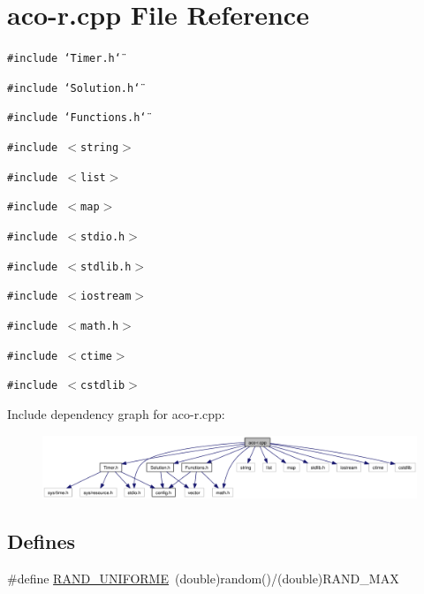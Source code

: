 \hypertarget{aco-r_8cpp}{
\section{aco-r.cpp File Reference}
\label{aco-r_8cpp}
}
{\tt \#include \char`\"{}Timer.h\char`\"{}}\par
{\tt \#include \char`\"{}Solution.h\char`\"{}}\par
{\tt \#include \char`\"{}Functions.h\char`\"{}}\par
{\tt \#include $<$string$>$}\par
{\tt \#include $<$list$>$}\par
{\tt \#include $<$map$>$}\par
{\tt \#include $<$stdio.h$>$}\par
{\tt \#include $<$stdlib.h$>$}\par
{\tt \#include $<$iostream$>$}\par
{\tt \#include $<$math.h$>$}\par
{\tt \#include $<$ctime$>$}\par
{\tt \#include $<$cstdlib$>$}\par


Include dependency graph for aco-r.cpp:\nopagebreak
\begin{figure}[H]
\begin{center}
\leavevmode
\includegraphics[width=420pt]{aco-r_8cpp__incl}
\end{center}
\end{figure}
\subsection*{Defines}
\begin{CompactItemize}
\item 
\#define \hyperlink{aco-r_8cpp_523b1c70fbff9e4e25f29b323bead209}{RAND\_\-UNIFORME}~(double)random()/(double)RAND\_\-MAX
\end{CompactItemize}
